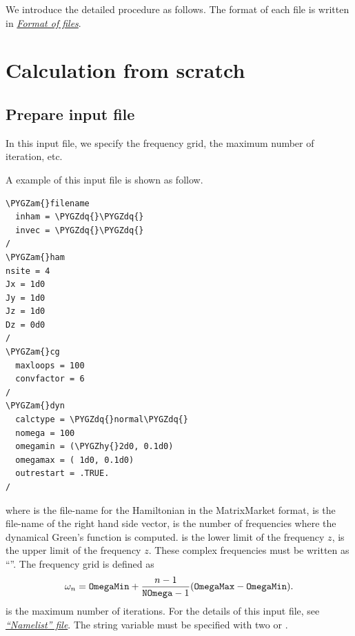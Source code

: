 \documentclass[letterpaper,10pt,dvipdfmx,openany]{sphinxmanual}
\def\PYGZam{\char`\&}
\def\PYGZhy{\char`\-}
\def\PYGZdq{\char`\"}
\begin{document}
We introduce the detailed procedure as follows.
The format of each file is written in {\hyperref[shiftk_format_en:fileformat]{\emph{Format of files}}}.


\section{Calculation from scratch}
\label{shiftk_flow_en:calculation-from-scratch}

\subsection{Prepare input file}
\label{shiftk_flow_en:prepare-input-file}
In this input file, we specify the frequency grid,
the maximum number of iteration, etc.

A example of this input file is shown as follow.

\begin{Verbatim}[commandchars=\\\{\}]
\PYGZam{}filename
  inham = \PYGZdq{}\PYGZdq{}
  invec = \PYGZdq{}\PYGZdq{}
/
\PYGZam{}ham
nsite = 4
Jx = 1d0
Jy = 1d0
Jz = 1d0
Dz = 0d0
/
\PYGZam{}cg
  maxloops = 100
  convfactor = 6
/
\PYGZam{}dyn
  calctype = \PYGZdq{}normal\PYGZdq{}
  nomega = 100
  omegamin = (\PYGZhy{}2d0, 0.1d0)
  omegamax = ( 1d0, 0.1d0)
  outrestart = .TRUE.
/
\end{Verbatim}

where  is the file-name for the Hamiltonian in the MatrixMarket format,
 is the file-name of the right hand side vector,
 is the number of frequencies where the dynamical Green's function
is computed.
 is the lower limit of the frequency \(z\),
 is the upper limit of the frequency \(z\).
These complex frequencies must be written as ``''.
The frequency grid is defined as
\begin{gather}
\begin{split}\begin{align}
\omega_n =  {\tt OmegaMin}
+ \frac{n-1}{{\tt NOmega}-1}({\tt OmegaMax} - {\tt OmegaMin}).
\end{align}\end{split}\notag
\end{gather}
 is the maximum number of iterations.
For the details of this input file, see {\hyperref[shiftk_format_en:modpara]{\emph{``Namelist'' file}}}.
The string variable must be specified with two  or .
\end{document}
